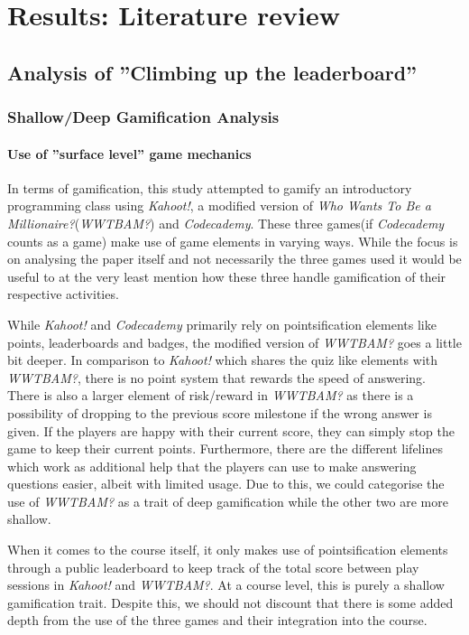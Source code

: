 \section{Results: Literature review}
\subsection{Analysis of ''Climbing up the leaderboard''}
\subsubsection{Shallow/Deep Gamification Analysis}
\paragraph{Use of ''surface level'' game mechanics}
In terms of gamification, this study attempted to gamify an introductory programming class using \emph{Kahoot!}, a modified version of \emph{Who Wants To Be a Millionaire?}(\emph{WWTBAM?}) and \emph{Codecademy}. These three games(if \emph{Codecademy} counts as a game) make use of game elements in varying ways. While the focus is on analysing the paper itself and not necessarily the three games used it would be useful to at the very least mention how these three handle gamification of their respective activities.  

While \emph{Kahoot!} and \emph{Codecademy} primarily rely on pointsification elements like points, leaderboards and badges, the modified version of \emph{WWTBAM?} goes a little bit deeper. In comparison to \emph{Kahoot!} which shares the quiz like elements with \emph{WWTBAM?}, there is no point system that rewards the speed of answering. There is also a larger element of risk/reward in \emph{WWTBAM?} as there is a possibility of dropping to the previous score milestone if the wrong answer is given. If the players are happy with their current score, they can simply stop the game to keep their current points. Furthermore, there are the different lifelines which work as additional help that the players can use to make answering questions easier, albeit with limited usage. Due to this, we could categorise the use of \emph{WWTBAM?} as a trait of deep gamification while the other two are more shallow. 

When it comes to the course itself, it only makes use of pointsification elements through a public leaderboard to keep track of the total score between play sessions in \emph{Kahoot!} and \emph{WWTBAM?}. At a course level, this is purely a shallow gamification trait. Despite this, we should not discount that there is some added depth from the use of the three games and their integration into the course. 

